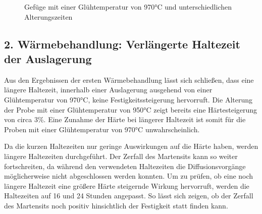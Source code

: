 \documentclass[a4paper, 11pt]{tubsreprt}
\begin{document}
\begin{figure} 		%
    \caption{Gefüge mit einer Glühtemperatur von 970°C und unterschiedlichen Alterungszeiten}
    \label{970 alterung}
\end{figure}



\subsection{2. Wärmebehandlung: Verlängerte Haltezeit der Auslagerung}
Aus den Ergebnissen der ersten Wärmebehandlung lässt sich schließen, dass eine längere Haltezeit, innerhalb einer Auslagerung ausgehend von einer Glühtemperatur von 970°C, keine Festigkeitssteigerung hervorruft. Die Alterung der Probe mit einer Glühtemperatur von 950°C zeigt bereits eine Härtesteigerung von circa 3\%. Eine Zunahme der Härte bei längerer Haltezeit ist somit für die Proben mit einer Glühtemperatur von 970°C unwahrscheinlich. 

Da die kurzen Haltezeiten nur geringe Auswirkungen auf die Härte haben, werden längere Haltezeiten durchgeführt. Der Zerfall des Martensits kann so weiter fortschreiten, da während den verwendeten Haltezeiten die Diffusionsvorgänge möglicherweise nicht abgeschlossen werden konnten. Um zu prüfen, ob eine noch längere Haltezeit eine größere Härte steigernde Wirkung hervorruft, werden die Haltezeiten auf 16 und 24 Stunden angepasst. So lässt sich zeigen, ob der Zerfall des Martensits noch positiv hinsichtlich der Festigkeit statt finden kann. 
\end{document}
